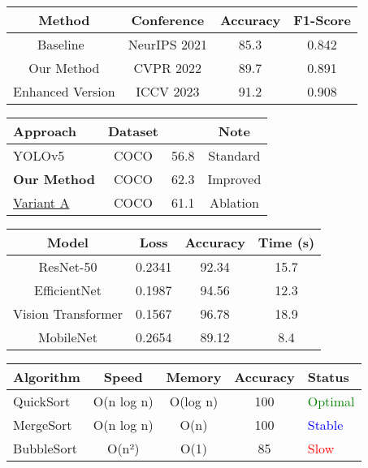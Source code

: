 
\begin{tabular}{|c|c|c|c|}
\hline
Method & Conference & Accuracy & F1-Score \\
\hline
  Baseline~\cite{base2021} &   NeurIPS 2021 &   85.3 &   0.842 \\
                Our Method &      CVPR 2022 &   89.7 &   0.891 \\
          Enhanced Version &      ICCV 2023 &   91.2 &   0.908 \\
\hline
\end{tabular}

\begin{tabular}{|l|c|c|c|}
\hline
\textbf{Approach} & \color{blue}Dataset & \cellcolor{gray!20}{mAP} & Note \\
\hline
YOLOv5~\cite{yolov5} & COCO & 56.8 & Standard \\
\textbf{Our Method} & COCO & 62.3 & Improved \\
\underline{Variant A} & COCO & 61.1 & Ablation \\
\hline
\end{tabular}

\begin{tabular}{|c|c|c|c|}
\hline
Model & Loss & Accuracy & Time (s) \\
\hline
ResNet-50 & 0.2341 & 92.34 & 15.7 \\
EfficientNet & 0.1987 & 94.56 & 12.3 \\
Vision Transformer & 0.1567 & 96.78 & 18.9 \\
MobileNet & 0.2654 & 89.12 & 8.4 \\
\hline
\end{tabular}

\begin{tabular}{|l|c|c|c|l|}
\hline
Algorithm & Speed & Memory & Accuracy & Status \\
\hline
QuickSort & O(n log n) & O(log n) & 100 & \textcolor{green}{Optimal} \\
MergeSort & O(n log n) & O(n) & 100 & \textcolor{blue}{Stable} \\
BubbleSort & O(n²) & O(1) & 85 & \textcolor{red}{Slow} \\
\hline
\end{tabular}

